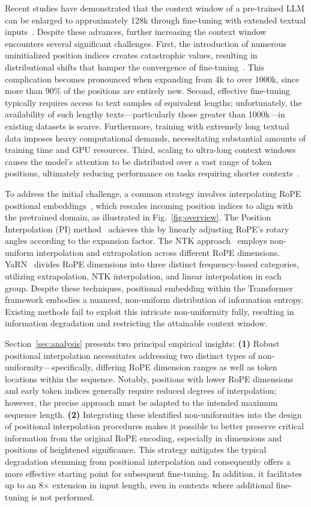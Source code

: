 Recent studies have demonstrated that the context window of a pre-trained LLM can be enlarged to approximately 128k through fine-tuning with extended textual inputs~\cite{longlora,pi,yarn,zhang2024soaring,liu2023scaling}. Despite these advances, further increasing the context window encounters several significant challenges. First, the introduction of numerous uninitialized position indices creates catastrophic values, resulting in distributional shifts that hamper the convergence of fine-tuning~\cite{pi}. This complication becomes pronounced when expanding from 4k to over 1000k, since more than 90\% of the positions are entirely new. Second, effective fine-tuning typically requires access to text samples of equivalent lengths; unfortunately, the availability of such lengthy texts—particularly those greater than 1000k—in existing datasets is scarce. Furthermore, training with extremely long textual data imposes heavy computational demands, necessitating substantial amounts of training time and GPU resources. Third, scaling to ultra-long context windows causes the model's attention to be distributed over a vast range of token positions, ultimately reducing performance on tasks requiring shorter contexts~\cite{pi}.

To address the initial challenge, a common strategy involves interpolating RoPE positional embeddings~\cite{rope,pi}, which rescales incoming position indices to align with the pretrained domain, as illustrated in Fig.~\ref{fig:overview}. The Position Interpolation (PI) method~\cite{pi} achieves this by linearly adjusting RoPE’s rotary angles according to the expansion factor. The NTK approach~\cite{ntk,dynamicntk} employs non-uniform interpolation and extrapolation across different RoPE dimensions. YaRN~\cite{yarn} divides RoPE dimensions into three distinct frequency-based categories, utilizing extrapolation, NTK interpolation, and linear interpolation in each group. Despite these techniques, positional embedding within the Transformer framework embodies a nuanced, non-uniform distribution of information entropy. Existing methods fail to exploit this intricate non-uniformity fully, resulting in information degradation and restricting the attainable context window.

Section~\ref{sec:analysis} presents two principal empirical insights: \textbf{(1)} Robust positional interpolation necessitates addressing two distinct types of non-uniformity—specifically, differing RoPE dimension ranges as well as token locations within the sequence. Notably, positions with lower RoPE dimensions and early token indices generally require reduced degrees of interpolation; however, the precise approach must be adapted to the intended maximum sequence length. \textbf{(2)} Integrating these identified non-uniformities into the design of positional interpolation procedures makes it possible to better preserve critical information from the original RoPE encoding, especially in dimensions and positions of heightened significance. This strategy mitigates the typical degradation stemming from positional interpolation and consequently offers a more effective starting point for subsequent fine-tuning. In addition, it facilitates up to an 8$\times$ extension in input length, even in contexts where additional fine-tuning is not performed.

